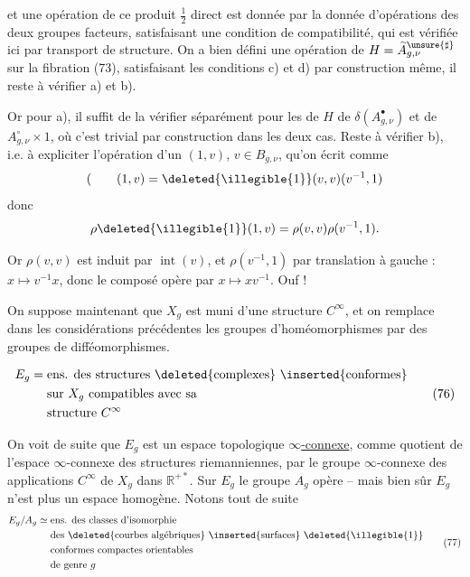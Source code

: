 
et une opération de ce produit \(\frac12\) direct est donnée  par  la donnée d'opérations des deux groupes facteurs, satisfaisant une condition de compatibilité, qui est vérifiée ici par transport de structure. On a bien défini une opération de \(H=\widetilde A_{g,\nu}^{\unsure{\sharp}}\) sur la fibration (73),  satisfaisant les conditions c) et d) par construction même, il reste à vérifier a) et b).

Or pour a), il suffit de la vérifier séparément pour les  de \(H\) de \(\delta(A_{g,\nu}^{\bullet})\) et de \(A_{g,\nu}^{\circ}\times 1\), où c'est trivial par construction dans les deux cas. Reste à vérifier b), i.e. à expliciter l'opération d'un  \((1,v)\), \(v\in B_{g,\nu}\), qu'on écrit comme
\[
 (\qquad (1,v)=\deleted{\illegible{1}}(v,v)(v^{-1},1)
\]
donc
\[
 \rho\deleted{\illegible{1}}(1,v)=\rho(v,v)\rho(v^{-1},1).
\]

Or \(\rho(v,v)\) est induit par \(\operatorname{int}(v)\),  et \(\rho(v^{-1},1)\) par translation à gauche : \(x\mapsto v^{-1}x\), donc le composé opère par \(x\mapsto xv^{-1}\). Ouf !


On suppose maintenant que \(X_g\) est muni d'une structure \(C^\infty\), et on remplace dans les considérations  précédentes les groupes d'homéomorphismes par des groupes de difféomorphismes.

\[
 \begin{aligned}
 E_g={}&\text{ens. des structures \deleted{complexes} \inserted{conformes}}\\
 &\text{sur }X_g\text{ compatibles avec sa}\\
 &\text{structure }C^\infty
 \end{aligned}
 \tag{76}
\]

 On voit de suite que \(E_g\) est un espace topologique \uline{\(\infty\)-connexe}, comme quotient de l'espace \(\infty\)-connexe  des structures riemanniennes, par le  groupe \(\infty\)-connexe des applications \(C^\infty\) de \(X_g\) dans \(\mathbb R^{+*}\). Sur \(E_g\) le groupe \(A_g\) opère -- mais bien sûr \(E_g\) n'est plus un espace homogène. Notons tout de suite
\[
 \begin{aligned}
 E_g/A_g\simeq{}&\text{ens. des classes d'isomorphie}\\
 &\text{des \deleted{courbes algébriques} \inserted{surfaces} \deleted{\illegible{1}}}\\
 &\text{conformes compactes orientables}\\
 &\text{de genre }g
 \end{aligned}
 \tag{77}
\]

